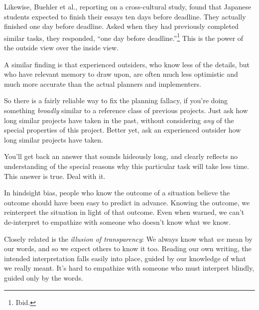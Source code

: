 {
 Likewise, Buehler et al., reporting on a cross-cultural study,
found that Japanese students expected to finish their essays ten days
before deadline. They actually finished one day before deadline. Asked
when they had previously completed similar tasks, they responded,
``one day before
deadline.''\footnote{Ibid.} This is the power of
the outside view over the inside view.}

{
 A similar finding is that experienced outsiders, who know less of
the details, but who have relevant memory to draw upon, are often much
less optimistic and much more accurate than the actual planners and
implementers.}

{
 So there is a fairly reliable way to fix the planning fallacy, if
you're doing something \textit{broadly} similar to a
reference class of previous projects. Just ask how long similar
projects have taken in the past, without considering \textit{any} of
the special properties of this project. Better yet, ask an experienced
outsider how long similar projects have taken.}

{
 You'll get back an answer that sounds hideously
long, and clearly reflects no understanding of the special reasons why
this particular task will take less time. This answer is true. Deal
with it.}

\myendsectiontext


\bigskip

\label{illusion_of_transparency}

{
 In hindsight bias, people who know the outcome of a situation
believe the outcome should have been easy to predict in advance.
Knowing the outcome, we reinterpret the situation in light of that
outcome. Even when warned, we can't de-interpret to
empathize with someone who doesn't know what we know. }

{
 Closely related is the \textit{illusion of transparency}: We
always know what \textit{we} mean by our words, and so we expect others
to know it too. Reading our own writing, the intended interpretation
falls easily into place, guided by our knowledge of what we really
meant. It's hard to empathize with someone who must
interpret blindly, guided only by the words.}

